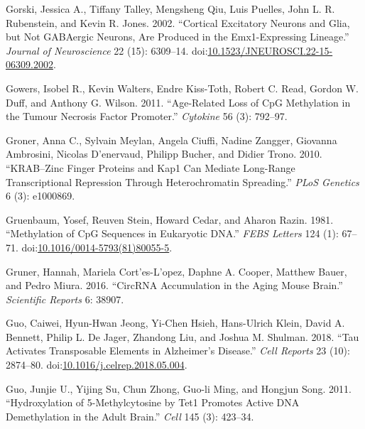 \documentclass[onehalf,12pt]{beavtex}
\begin{document}
  \hypertarget{ref-GorskiCorticalExcitatoryNeurons2002}{}
  Gorski, Jessica A., Tiffany Talley, Mengsheng Qiu, Luis Puelles, John L.
  R. Rubenstein, and Kevin R. Jones. 2002. ``Cortical Excitatory Neurons
  and Glia, but Not GABAergic Neurons, Are Produced in the Emx1-Expressing
  Lineage.'' \emph{Journal of Neuroscience} 22 (15): 6309--14.
  doi:\href{https://doi.org/10.1523/JNEUROSCI.22-15-06309.2002}{10.1523/JNEUROSCI.22-15-06309.2002}.
  
  \hypertarget{ref-GowersAgerelatedlossCpG2011}{}
  Gowers, Isobel R., Kevin Walters, Endre Kiss-Toth, Robert C. Read,
  Gordon W. Duff, and Anthony G. Wilson. 2011. ``Age-Related Loss of CpG
  Methylation in the Tumour Necrosis Factor Promoter.'' \emph{Cytokine} 56
  (3): 792--97.
  
  \hypertarget{ref-GronerKRABzincfinger2010}{}
  Groner, Anna C., Sylvain Meylan, Angela Ciuffi, Nadine Zangger, Giovanna
  Ambrosini, Nicolas D\a'enervaud, Philipp Bucher, and Didier Trono. 2010.
  ``KRAB--Zinc Finger Proteins and Kap1 Can Mediate Long-Range
  Transcriptional Repression Through Heterochromatin Spreading.''
  \emph{PLoS Genetics} 6 (3): e1000869.
  
  \hypertarget{ref-GruenbaumMethylationCpGsequences1981}{}
  Gruenbaum, Yosef, Reuven Stein, Howard Cedar, and Aharon Razin. 1981.
  ``Methylation of CpG Sequences in Eukaryotic DNA.'' \emph{FEBS Letters}
  124 (1): 67--71.
  doi:\href{https://doi.org/10.1016/0014-5793(81)80055-5}{10.1016/0014-5793(81)80055-5}.
  
  \hypertarget{ref-GrunerCircRNAaccumulationaging2016}{}
  Gruner, Hannah, Mariela Cort\a'es-L\a'opez, Daphne A. Cooper, Matthew
  Bauer, and Pedro Miura. 2016. ``CircRNA Accumulation in the Aging Mouse
  Brain.'' \emph{Scientific Reports} 6: 38907.
  
  \hypertarget{ref-GuoTauActivatesTransposable2018}{}
  Guo, Caiwei, Hyun-Hwan Jeong, Yi-Chen Hsieh, Hans-Ulrich Klein, David A.
  Bennett, Philip L. De Jager, Zhandong Liu, and Joshua M. Shulman. 2018.
  ``Tau Activates Transposable Elements in Alzheimer's Disease.''
  \emph{Cell Reports} 23 (10): 2874--80.
  doi:\href{https://doi.org/10.1016/j.celrep.2018.05.004}{10.1016/j.celrep.2018.05.004}.
  
  \hypertarget{ref-GuoHydroxylation5methylcytosineTET12011}{}
  Guo, Junjie U., Yijing Su, Chun Zhong, Guo-li Ming, and Hongjun Song.
  2011. ``Hydroxylation of 5-Methylcytosine by Tet1 Promotes Active DNA
  Demethylation in the Adult Brain.'' \emph{Cell} 145 (3): 423--34.
  
\end{document}
